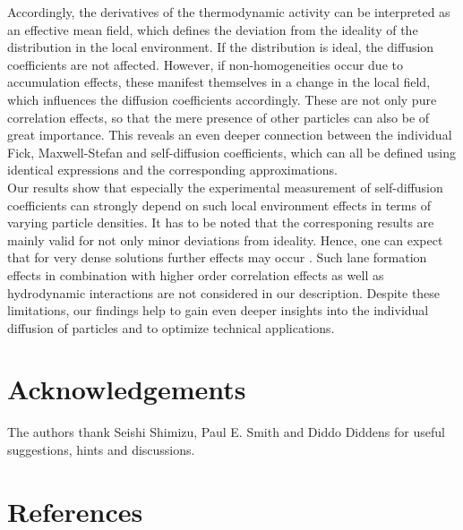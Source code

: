 \documentclass[aip,jcp,reprint]{revtex4-1}
\begin{document}
Accordingly, the derivatives of the thermodynamic activity can be interpreted as an effective mean field, which defines the deviation from the ideality of the distribution in the local environment. If the distribution is ideal, the diffusion coefficients are  not affected. However, if non-homogeneities occur due to accumulation effects, these manifest themselves in a change in the local field, which influences the diffusion coefficients accordingly.  These are not only pure correlation effects, so that the mere presence of other particles can also be of great importance. This reveals an even deeper connection between the individual Fick, Maxwell-Stefan and self-diffusion coefficients, which can all be defined using identical expressions and the corresponding approximations. \\
Our results show that especially the experimental measurement of self-diffusion coefficients can strongly depend on such local environment effects in terms of varying particle densities. It has to be noted that the corresponing results are mainly valid for not only minor deviations from ideality. Hence, one can expect that for very dense solutions further effects may occur \cite{rex08a}. Such lane formation effects in combination with higher order correlation effects as well as hydrodynamic interactions are not considered in our description. Despite these limitations, our findings help to gain even deeper insights into the individual diffusion of particles and to optimize technical applications.

\section{Acknowledgements}
The authors thank Seishi Shimizu, Paul E. Smith and Diddo Diddens for useful suggestions, hints and discussions. 

\section*{References}


\end{document}
